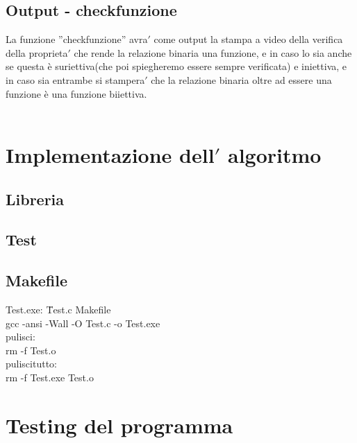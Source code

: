 \documentclass[11pt, a4paper, titlepage, block]{article}
\begin{document}
	\subsection{Output - check\textunderscore funzione}
	La funzione ”check\textunderscore funzione” avra$'$  come output la stampa a video della verifica della proprieta$'$  che rende la relazione binaria una funzione, e in caso lo sia anche se questa \`e  suriettiva(che poi spiegheremo essere sempre verificata) e iniettiva, e in caso sia entrambe si stampera$'$  che la relazione binaria oltre ad essere una funzione \`e  una funzione biiettiva.\\
	\\
	\newpage
	\section{Implementazione dell$'$ algoritmo}
	\subsection{Libreria}
	\lstset{numbers=left, tabsize=2,breaklines=true, language=C}
	 
	\newpage
	\subsection{Test}
	\lstset{numbers=left, tabsize=2,breaklines=true, language=C}
	
	\newpage
\subsection{Makefile}
\begin{tabbing}
	Test.exe: \=Test.c Makefile\\
	\>gcc -ansi -Wall -O Test.c -o Test.exe\\
	pulisci:\\
	\>rm -f Test.o\\
	pulisci\textunderscore tutto:\\
	\>rm -f Test.exe Test.o\\
\end{tabbing}
	
	
	
	
	
	
	
	\newpage
	\section{Testing del programma}
\end{document}
